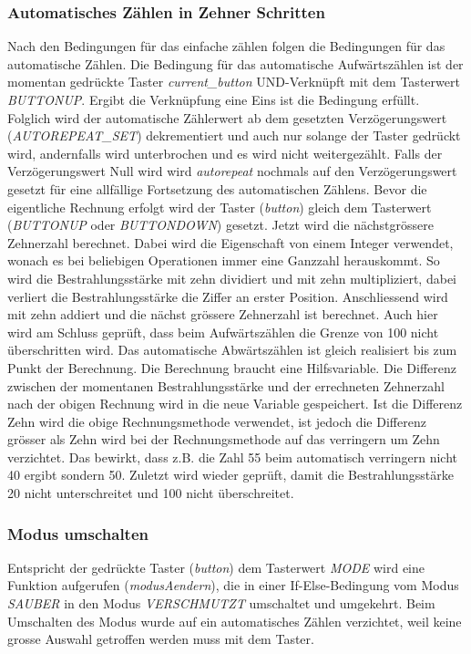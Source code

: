 \subsubsection{Automatisches Zählen in Zehner Schritten}
Nach den Bedingungen für das einfache zählen folgen die Bedingungen für das automatische Zählen. Die Bedingung für das automatische Aufwärtszählen ist der momentan gedrückte Taster \textit{current\_button} UND-Verknüpft mit dem Tasterwert \textit{BUTTONUP}. Ergibt die Verknüpfung eine Eins ist die Bedingung erfüllt. Folglich wird der automatische Zählerwert ab dem gesetzten Verzögerungswert (\textit{AUTOREPEAT_SET}) dekrementiert und auch nur solange der Taster gedrückt wird, andernfalls wird unterbrochen und es wird nicht weitergezählt. Falls der Verzögerungswert Null wird wird \textit{autorepeat} nochmals auf den Verzögerungswert gesetzt für eine allfällige Fortsetzung des automatischen Zählens. Bevor die eigentliche Rechnung erfolgt wird der Taster (\textit{button}) gleich dem Tasterwert (\textit{BUTTONUP} oder \textit{BUTTONDOWN}) gesetzt. Jetzt wird die nächstgrössere Zehnerzahl berechnet. Dabei wird die Eigenschaft von einem Integer verwendet, wonach es bei beliebigen Operationen immer eine Ganzzahl herauskommt. So wird die Bestrahlungsstärke mit zehn dividiert und mit zehn multipliziert, dabei verliert die Bestrahlungsstärke die Ziffer an erster Position. Anschliessend wird mit zehn addiert und die nächst grössere Zehnerzahl ist berechnet. Auch hier wird am Schluss geprüft, dass beim Aufwärtszählen die Grenze von 100 nicht überschritten wird.
\newline
Das automatische Abwärtszählen ist gleich realisiert bis zum Punkt der Berechnung. Die Berechnung braucht eine Hilfsvariable. Die Differenz zwischen der momentanen Bestrahlungsstärke und der errechneten Zehnerzahl nach der obigen Rechnung wird in die neue Variable gespeichert. Ist die Differenz Zehn wird die obige Rechnungsmethode verwendet, ist jedoch die Differenz grösser als Zehn wird bei der Rechnungsmethode auf das verringern um Zehn verzichtet. Das bewirkt, dass z.B. die Zahl 55 beim automatisch verringern nicht 40 ergibt sondern 50. Zuletzt wird wieder geprüft, damit die Bestrahlungsstärke 20 nicht unterschreitet und 100 nicht überschreitet.

\subsubsection{Modus umschalten}
Entspricht der gedrückte Taster (\textit{button}) dem Tasterwert \textit{MODE} wird eine Funktion aufgerufen (\textit{modusAendern}), die in einer If-Else-Bedingung vom Modus \textit{SAUBER} in den Modus \textit{VERSCHMUTZT} umschaltet und umgekehrt. Beim Umschalten des Modus wurde auf ein automatisches Zählen verzichtet, weil keine grosse Auswahl getroffen werden muss mit dem Taster.

